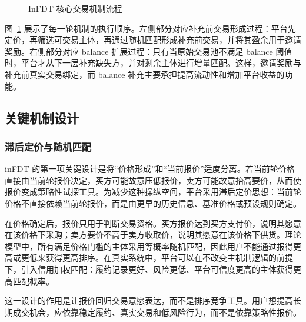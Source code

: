 \documentclass[UTF8,a4paper,12pt]{ctexart}
\begin{document}
\begin{figure}[htbp]
{
    }
    \caption{InFDT 核心交易机制流程}
    \label{fig:infdt-mechanism-flow}
\end{figure}

图~\ref{fig:infdt-mechanism-flow} 展示了每一轮机制的执行顺序。左侧部分对应补充前交易形成过程：平台先定价，再筛选可交易主体，再通过随机匹配形成补充前交易，并将其盈余用于邀请奖励。右侧部分对应 balance 扩展过程：只有当原始交易池不满足 balance 阈值时，平台才从下一层补充缺失方，并对剩余主体进行增量匹配。这样，邀请奖励与补充前真实交易绑定，而 balance 补充主要承担提高流动性和增加平台收益的功能。

\subsection{关键机制设计}

\subsubsection{滞后定价与随机匹配}

inFDT 的第一项关键设计是将“价格形成”和“当前报价”适度分离。若当前轮价格直接由当前轮报价决定，买方可能故意压低报价，卖方可能故意抬高要价，从而使报价变成策略性试探工具。为减少这种操纵空间，平台采用滞后定价思想：当前轮价格不直接依赖当前轮报价，而是由更早的历史信息、基准价格或预设规则确定。

在价格确定后，报价只用于判断交易资格。买方报价达到买方支付价，说明其愿意在该价格下采购；卖方要价不高于卖方收取价，说明其愿意在该价格下供货。理论模型中，所有满足价格门槛的主体采用等概率随机匹配，因此用户不能通过报得更高或更低来获得更高排序。在真实系统中，平台可以在不改变主机制逻辑的前提下，引入信用加权匹配：履约记录更好、风险更低、平台可信度更高的主体获得更高匹配概率。

这一设计的作用是让报价回归交易意愿表达，而不是排序竞争工具。用户想提高长期成交机会，应依靠稳定履约、真实交易和低风险行为，而不是依靠策略性报价。
\end{document}
